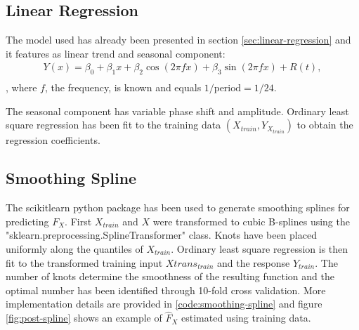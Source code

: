 \subsection{Linear Regression}

The model used has already been presented in section \ref{sec:linear-regression} and
it features as linear trend and seasonal component:
\begin{gather*}
Y(x) = \beta_0 + \beta_1 x + \beta_2 \cos(2 \pi f x) + \beta_3 \sin(2 \pi f x) + R(t), \\
\end{gather*}
, where $f$, the frequency, is known and equals $1/\text{period} = 1/24$.

The seasonal component has variable phase shift and amplitude.
Ordinary least square regression has been fit to the training data
$(X_{train}, Y_{X_{train}})$ to obtain the regression coefficients.

%

\subsection{Smoothing Spline}
The scikitlearn python package has been used to
generate smoothing splines for predicting $F_X$.
First $X_{train}$ and $X$ were transformed to cubic B-splines using the \\
"sklearn.preprocessing.SplineTransformer" class.
Knots have been placed uniformly along the quantiles of $X_{train}$.
Ordinary least square regression is then fit to the transformed training
input $Xtrans_{train}$ and the response $Y_{train}$.
The number of knots determine the smoothness of the resulting function
and the optimal number has been identified through 10-fold
cross validation.
%
More implementation details are provided in \ref{code:smoothing-spline}
and figure \ref{fig:post-spline} shows an example of $\hat{F}_X$ estimated
using training data.

